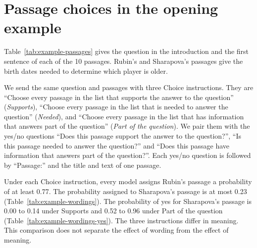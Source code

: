 \section{Passage choices in the opening example}
\label{app:example}
Table~\ref{tab:example-passages} gives the question in the introduction and the first sentence of each of the 10 passages. Rubin's and Sharapova's passages give the birth dates needed to determine which player is older.

\begin{table}[H]
\caption{The opening HotpotQA question, the instruction to choose every passage that supports the answer, and the 10 passage titles and texts in the order sent.}
\label{tab:example-passages}
\centering
\small

\end{table}

We send the same question and passages with three Choice instructions. They are ``Choose every passage in the list that supports the answer to the question'' (\emph{Supports}), ``Choose every passage in the list that is needed to answer the question'' (\emph{Needed}), and ``Choose every passage in the list that has information that answers part of the question'' (\emph{Part of the question}). We pair them with the yes/no questions ``Does this passage support the answer to the question?'', ``Is this passage needed to answer the question?'' and ``Does this passage have information that answers part of the question?''. Each yes/no question is followed by ``Passage:'' and the title and text of one passage.

\begin{table}[H]
\caption{Mean model probability. \emph{Distractor} is the highest probability among the other eight passages. Luna is GPT-6 Luna Decisions.}
\label{tab:example-wordings}
\centering
\resizebox{\linewidth}{!}{%
}
\end{table}

\begin{table}[H]
\caption{Mean probability of yes, with \emph{Distractor} as in Table~\ref{tab:example-wordings}.}
\label{tab:example-wordings-yes}
\centering
\resizebox{\linewidth}{!}{%
}
\end{table}

Under each Choice instruction, every model assigns Rubin's passage a probability of at least 0.77. The probability assigned to Sharapova's passage is at most 0.23 (Table~\ref{tab:example-wordings}). The probability of yes for Sharapova's passage is 0.00 to 0.14 under Supports and 0.52 to 0.96 under Part of the question (Table~\ref{tab:example-wordings-yes}). The three instructions differ in meaning. This comparison does not separate the effect of wording from the effect of meaning.

